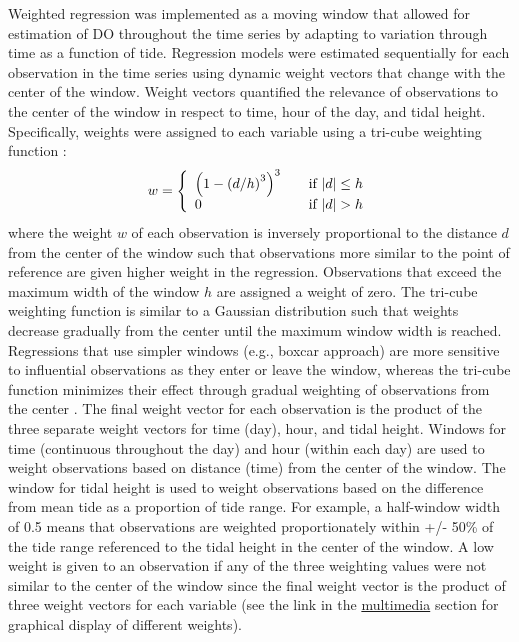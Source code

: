 \documentclass[letterpaper,12pt,oneside]{article}\usepackage[]{graphicx}\usepackage[]{color}
\begin{document}
Weighted regression was implemented as a moving window that allowed for estimation of \ac{DO} throughout the time series by adapting to variation through time as a function of tide. Regression models were estimated sequentially for each observation in the time series using dynamic weight vectors that change with the center of the window.  Weight vectors quantified the relevance of observations to the center of the window in respect to time, hour of the day, and tidal height.  Specifically, weights were assigned to each variable using a tri-cube weighting function \citep{Tukey77,Hirsch10}:
\begin{equation}
w= \left\{ 
  \begin{array}{l l}
    \left(1-\left(d/h\right)^3\right)^3 & \quad \textrm{if } |d| \leq h \\
    0 & \quad \textrm{if } |d| > h 
  \end{array} \right.
\end{equation}
where the weight $w$ of each observation is inversely proportional to the distance $d$ from the center of the window such that observations more similar to the point of reference are given higher weight in the regression.  Observations that exceed the maximum width of the window $h$ are assigned a weight of zero.  The tri-cube weighting function is similar to a Gaussian distribution such that weights decrease gradually from the center until the maximum window width is reached.  Regressions that use simpler windows (e.g., boxcar approach) are  more sensitive to influential observations as they enter or leave the window, whereas the tri-cube function minimizes their effect through gradual weighting of observations from the center \citep{Hirsch10}.  The final weight vector for each observation is the product of the three separate weight vectors for time (day), hour, and tidal height. Windows for time (continuous throughout the day) and hour (within each day) are used to weight observations based on distance (time) from the center of the window.  The window for tidal height is used to weight observations based on the difference from mean tide as a proportion of tide range.  For example, a half-window width of 0.5 means that observations are weighted proportionately within +/- 50\% of the tide range referenced to the tidal height in the center of the window. A low weight is given to an observation if any of the three weighting values were not similar to the center of the window since the final weight vector is the product of three weight vectors for each variable (see the link in the \hyperref[multi]{multimedia} section for graphical display of different weights).    
\end{document}
